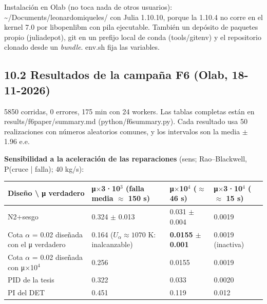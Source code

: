 \documentclass[11pt,a4paper]{article}
\newcommand{\codeus}{\textunderscore\allowbreak}
\newcommand{\code}[1]{{\small\ttfamily\let\_\codeus #1}}
\begin{document}
Instalación en Olab (no toca nada de otros usuarios): \code{\textasciitilde{}/Documents/leonardo\_miqueles/} con Julia 1.10.10, porque la 1.10.4 no corre en el kernel 7.0 por \code{libopenlibm} con pila ejecutable. También un depósito de paquetes propio (\code{julia\_depot}), git en un prefijo local de conda (\code{tools/gitenv}) y el repositorio clonado desde un \emph{bundle}. \code{env.sh} fija las variables.

\subsection*{10.2 Resultados de la campaña F6 (Olab, 18-11-2026)}
5850 corridas, 0 errores, 175 min con 24 workers. Las tablas completas están en \code{results/f6\_paper/summary.md} (\code{python/f6\_summary.py}). Cada resultado usa 50 realizaciones con números aleatorios comunes, y los intervalos son la media $\pm$ 1.96 e.e.

\textbf{Sensibilidad a la aceleración de las reparaciones} (\code{sens}; Rao–Blackwell, P(cruce | falla); 40 kg/s):

{\footnotesize
\begin{xltabular}{\linewidth}{@{}YYYY@{}}
\toprule
\textbf{Diseño \textbackslash{} μ verdadero} & \textbf{μ$\times$3·10$^{3}$ (falla media $\approx$ 150 s)} & \textbf{μ$\times$10$^{4}$ ($\approx$ 46 s)} & \textbf{μ$\times$3·10$^{4}$ ($\approx$ 15 s)} \\
\midrule
\endhead
N2+sesgo & 0.324 $\pm$ 0.013 & 0.031 $\pm$ 0.004 & 0.0019 \\
Cota $\alpha$ = 0.02 diseñada con el μ verdadero & 0.164 ($U_\alpha\approx1070$ K: inalcanzable) & \textbf{0.0155 $\pm$ 0.001} & 0.0019 (inactiva) \\
Cota $\alpha$ = 0.02 diseñada con μ$\times$10$^{4}$ & 0.256 & 0.0155 & 0.0019 \\
PID de la tesis & 0.322 & 0.033 & 0.0020 \\
PI del DET & 0.451 & 0.119 & 0.012 \\
\bottomrule
\end{xltabular}}
\end{document}
